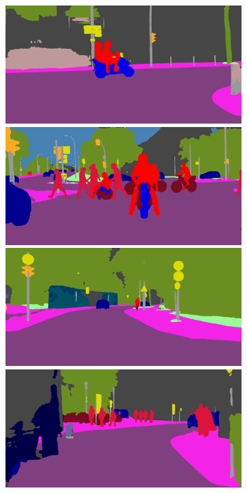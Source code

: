 {\begin{figure}[t]
{{\begin{subfigure}[t]{0.24\linewidth}
\begin{center}
		\includegraphics[width=\linewidth,trim={0px 60px 0 0px},clip]{failure/mainz_000001_031026_semantic_segmentation_rgb.png}
		\includegraphics[width=\linewidth,trim={0px 60px 0 0px},clip]{failure/mainz_000003_014457_semantic_segmentation_rgb.png}
		\includegraphics[width=\linewidth,trim={0px 60px 0 0px},clip]{failure/munich_000252_000019_semantic_segmentation_rgb.png}
		\includegraphics[width=\linewidth,trim={0px 60px 0 0px},clip]{failure/munich_000158_000019_semantic_segmentation_rgb.png}

\end{center}
\end{subfigure}}}
\end{figure}}
